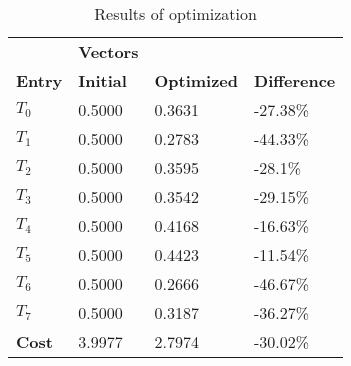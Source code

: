 \begin{table}[h!]
\centering
\begin{tabular}{llll}
\textbf{}      & \cellcolor[HTML]{EFEFEF}\textbf{Vectors} & \textbf{} & \textbf{}         \\
\rowcolor[HTML]{EFEFEF} 
\textbf{Entry} & \textbf{Initial} & \textbf{Optimized} & \textbf{Difference} \\
$T_0$ & 0.5000 & 0.3631 & -27.38\% \\ 
$T_1$ & 0.5000 & 0.2783 & -44.33\% \\ 
$T_2$ & 0.5000 & 0.3595 & -28.1\% \\ 
$T_3$ & 0.5000 & 0.3542 & -29.15\% \\ 
$T_4$ & 0.5000 & 0.4168 & -16.63\% \\ 
$T_5$ & 0.5000 & 0.4423 & -11.54\% \\ 
$T_6$ & 0.5000 & 0.2666 & -46.67\% \\ 
$T_7$ & 0.5000 & 0.3187 & -36.27\% \\ 
\rowcolor[HTML]{EFEFEF} 
\textbf{Cost}  & 3.9977 & 2.7974 & -30.02\% \\ 
\end{tabular}
\caption{Results of optimization}
\label{tab:OptimizationAnalysis}
\end{table}